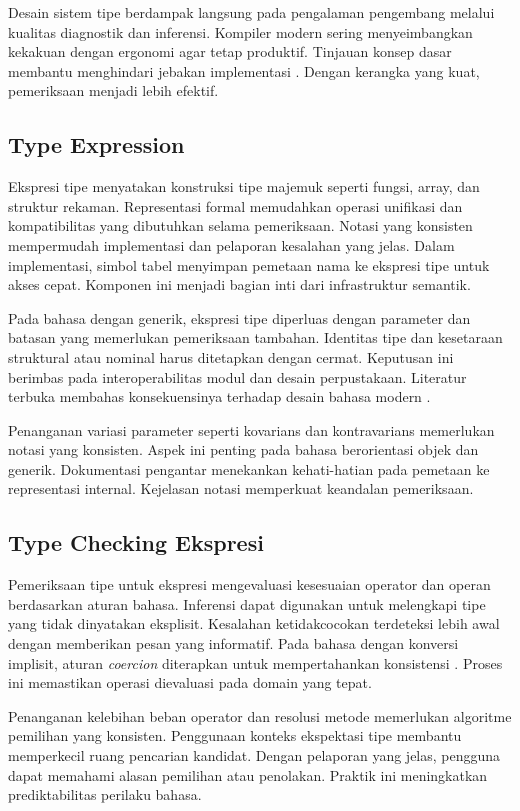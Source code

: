 \documentclass[../main.tex]{subfiles}
\begin{document}
Desain sistem tipe berdampak langsung pada pengalaman pengembang melalui kualitas diagnostik dan inferensi. Kompiler modern sering menyeimbangkan kekakuan dengan ergonomi agar tetap produktif. Tinjauan konsep dasar membantu menghindari jebakan implementasi \citep{WikiTypeSystem}. Dengan kerangka yang kuat, pemeriksaan menjadi lebih efektif.

\subsection{Type Expression}
Ekspresi tipe menyatakan konstruksi tipe majemuk seperti fungsi, array, dan struktur rekaman. Representasi formal memudahkan operasi unifikasi dan kompatibilitas yang dibutuhkan selama pemeriksaan. Notasi yang konsisten mempermudah implementasi dan pelaporan kesalahan yang jelas. Dalam implementasi, simbol tabel menyimpan pemetaan nama ke ekspresi tipe untuk akses cepat. Komponen ini menjadi bagian inti dari infrastruktur semantik.

Pada bahasa dengan generik, ekspresi tipe diperluas dengan parameter dan batasan yang memerlukan pemeriksaan tambahan. Identitas tipe dan kesetaraan struktural atau nominal harus ditetapkan dengan cermat. Keputusan ini berimbas pada interoperabilitas modul dan desain perpustakaan. Literatur terbuka membahas konsekuensinya terhadap desain bahasa modern \citep{WikiTypeSystem}.

Penanganan variasi parameter seperti kovarians dan kontravarians memerlukan notasi yang konsisten. Aspek ini penting pada bahasa berorientasi objek dan generik. Dokumentasi pengantar menekankan kehati-hatian pada pemetaan ke representasi internal. Kejelasan notasi memperkuat keandalan pemeriksaan.

\subsection{Type Checking Ekspresi}
Pemeriksaan tipe untuk ekspresi mengevaluasi kesesuaian operator dan operan berdasarkan aturan bahasa. Inferensi dapat digunakan untuk melengkapi tipe yang tidak dinyatakan eksplisit. Kesalahan ketidakcocokan terdeteksi lebih awal dengan memberikan pesan yang informatif. Pada bahasa dengan konversi implisit, aturan \emph{coercion} diterapkan untuk mempertahankan konsistensi \citep{WikiTypeChecking,WikiCoercion}. Proses ini memastikan operasi dievaluasi pada domain yang tepat.

Penanganan kelebihan beban operator dan resolusi metode memerlukan algoritme pemilihan yang konsisten. Penggunaan konteks ekspektasi tipe membantu memperkecil ruang pencarian kandidat. Dengan pelaporan yang jelas, pengguna dapat memahami alasan pemilihan atau penolakan. Praktik ini meningkatkan prediktabilitas perilaku bahasa.
\end{document}
